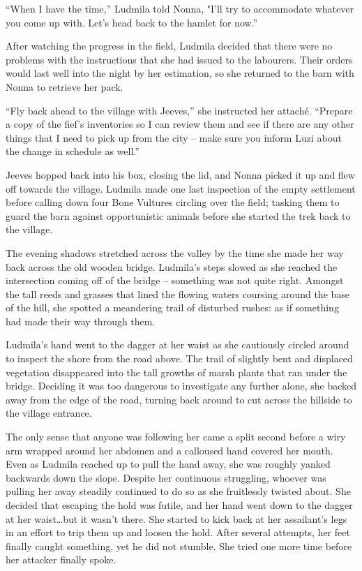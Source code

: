  

“When I have the time,” Ludmila told Nonna, "I’ll try to accommodate whatever you come up with. Let’s head back to the hamlet for now.”

 

After watching the progress in the field, Ludmila decided that there were no problems with the instructions that she had issued to the labourers. Their orders would last well into the night by her estimation, so she returned to the barn with Nonna to retrieve her pack.

 

“Fly back ahead to the village with Jeeves,” she instructed her attaché. “Prepare a copy of the fief’s inventories so I can review them and see if there are any other things that I need to pick up from the city – make sure you inform Luzi about the change in schedule as well.”

 

Jeeves hopped back into his box, closing the lid, and Nonna picked it up and flew off towards the village. Ludmila made one last inspection of the empty settlement before calling down four Bone Vultures circling over the field; tasking them to guard the barn against opportunistic animals before she started the trek back to the village.

 

The evening shadows stretched across the valley by the time she made her way back across the old wooden bridge. Ludmila’s steps slowed as she reached the intersection coming off of the bridge – something was not quite right. Amongst the tall reeds and grasses that lined the flowing waters coursing around the base of the hill, she spotted a meandering trail of disturbed rushes: as if something had made their way through them.

 

Ludmila’s hand went to the dagger at her waist as she cautiously circled around to inspect the shore from the road above. The trail of slightly bent and displaced vegetation disappeared into the tall growths of marsh plants that ran under the bridge. Deciding it was too dangerous to investigate any further alone, she backed away from the edge of the road, turning back around to cut across the hillside to the village entrance.

 

The only sense that anyone was following her came a split second before a wiry arm wrapped around her abdomen and a calloused hand covered her mouth. Even as Ludmila reached up to pull the hand away, she was roughly yanked backwards down the slope. Despite her continuous struggling, whoever was pulling her away steadily continued to do so as she fruitlessly twisted about. She decided that escaping the hold was futile, and her hand went down to the dagger at her waist…but it wasn’t there. She started to kick back at her assailant’s legs in an effort to trip them up and loosen the hold. After several attempts, her feet finally caught something, yet he did not stumble. She tried one more time before her attacker finally spoke.

